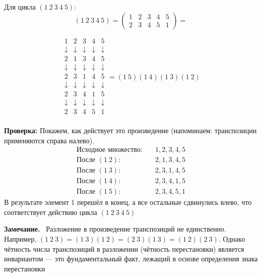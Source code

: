 \documentclass[a4paper,12pt]{article}
\newcommand{\myremark}{\textbf{Замечание.}\ }
\theoremstyle{definition}
\theoremstyle{plain}
\theoremstyle{remark}
\begin{document}
	
	\begin{tcolorbox}[colback=gray!5, colframe=gray!50, title=Пример]
	Для цикла $(1\ 2\ 3\ 4\ 5)$:
	\[
	(1\ 2\ 3\ 4\ 5) = \begin{pmatrix}
	1 & 2 & 3 & 4 & 5 \\
	2 & 3 & 4 & 5 & 1
	\end{pmatrix} =
	\]
	
	\[
	\begin{array}{ccccc}
	1 & 2 & 3 & 4 & 5 \\
	\downarrow & \downarrow & \downarrow & \downarrow & \downarrow \\
	2 & 1 & 3 & 4 & 5 \\
	\downarrow & \downarrow & \downarrow & \downarrow & \downarrow \\
	2 & 3 & 1 & 4 & 5 \\
	\downarrow & \downarrow & \downarrow & \downarrow & \downarrow \\
	2 & 3 & 4 & 1 & 5 \\
	\downarrow & \downarrow & \downarrow & \downarrow & \downarrow \\
	2 & 3 & 4 & 5 & 1 \\
	\end{array} = (1\ 5)(1\ 4)(1\ 3)(1\ 2)
	\]
	
	
	\textbf{Проверка:} Покажем, как действует это произведение (напоминаем: транспозиции применяются справа налево).
	\begin{align*}
	\text{Исходное множество:} &\quad 1, 2, 3, 4, 5 \\
	\text{После } (1\ 2): &\quad 2, 1, 3, 4, 5 \\
	\text{После } (1\ 3): &\quad 2, 3, 1, 4, 5 \\
	\text{После } (1\ 4): &\quad 2, 3, 4, 1, 5 \\
	\text{После } (1\ 5): &\quad 2, 3, 4, 5, 1
	\end{align*}
	В результате элемент 1 перешёл в конец, а все остальные сдвинулись влево, что соответствует действию цикла $(1\ 2\ 3\ 4\ 5)$
	
	
	\end{tcolorbox}
	
	
	
	
	
	
	\myremark
	Разложение в произведение транспозиций не единственно. Например, $(1\ 2\ 3) = (1\ 3)(1\ 2) = (2\ 3)(1\ 3) = (1\ 2)(2\ 3)$. Однако чётность числа транспозиций в разложении (чётность перестановки) является инвариантом — это фундаментальный факт, лежащий в основе определения знака перестановки
	
\end{document}
